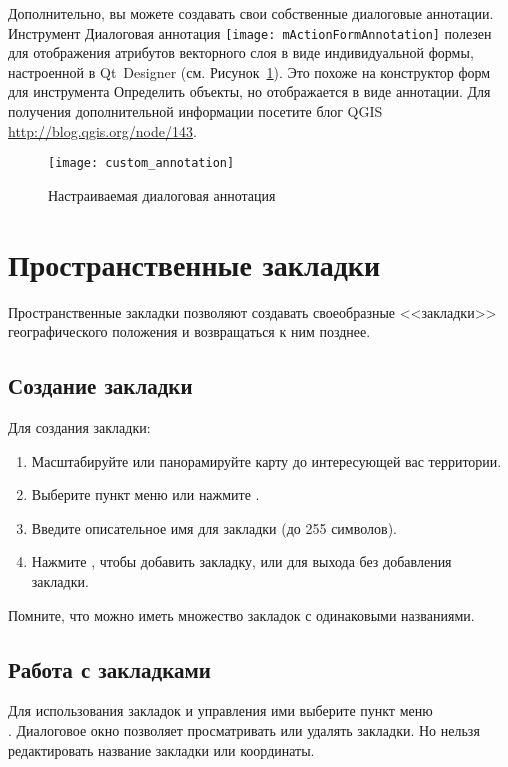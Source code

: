 Дополнительно, вы можете создавать свои собственные диалоговые аннотации.
Инструмент Диалоговая аннотация
\texttt{[image: mActionFormAnnotation]} полезен
для отображения атрибутов векторного слоя в виде индивидуальной формы,
настроенной в Qt~Designer (см. Рисунок~\ref{fig:custom-annotations}).
Это похоже на конструктор форм для инструмента Определить объекты, но
отображается в виде аннотации. Для получения дополнительной информации
посетите блог QGIS \url{http://blog.qgis.org/node/143}.

\begin{figure}[ht]
   \centering
   \texttt{[image: custom\_annotation]}
   \caption{Настраиваемая диалоговая аннотация \wincaption}
   \label{fig:custom-annotations}
\end{figure}

\newpage

\section{Пространственные закладки}\label{sec:bookmarks}

Пространственные закладки позволяют создавать своеобразные <<закладки>>
географического положения и возвращаться к ним позднее.

\subsection{Создание закладки}
Для создания закладки:
\begin{enumerate}
\item Масштабируйте или панорамируйте карту до интересующей вас территории.
\item Выберите пункт меню  \arrow
{} или нажмите .
\item Введите описательное имя для закладки (до 255 символов).
\item Нажмите , чтобы добавить закладку, или 
для выхода без добавления закладки.
\end{enumerate}

Помните, что можно иметь множество закладок с одинаковыми названиями.

\subsection{Работа с закладками}
Для использования закладок и управления ими выберите пункт меню
 \arrow \\ . Диалоговое
окно  позволяет просматривать или удалять
закладки. Но нельзя редактировать название закладки или координаты.

